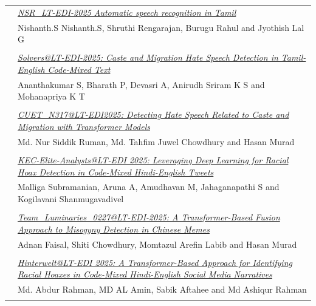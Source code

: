 \documentclass[11pt,oneside]{book}
\begin{document}
\begin{tabular}{p{24mm}p{124mm}}
                      & \hyperlink{page.95}{\emph{NSR\_LT-EDI-2025 Automatic speech recognition in Tamil}}\\
        & Nishanth.S Nishanth.S\index{Nishanth.S}, Shruthi Rengarajan\index{Rengarajan}, Burugu Rahul\index{Rahul} and Jyothish Lal G\index{G}\\\\
                
                      & \hyperlink{page.100}{\emph{Solvers@LT-EDI-2025: Caste and Migration Hate Speech Detection in Tamil-English Code-Mixed Text}}\\
        & Ananthakumar S\index{S}, Bharath P\index{P}, Devasri A\index{A}, Anirudh Sriram K S\index{S} and Mohanapriya K T\index{T}\\\\
                
                      & \hyperlink{page.105}{\emph{CUET\_N317@LT-EDI2025: Detecting Hate Speech Related to Caste and Migration with Transformer Models}}\\
        & Md. Nur Siddik Ruman\index{Ruman}, Md. Tahfim Juwel Chowdhury\index{Chowdhury} and Hasan Murad\index{Murad}\\\\
                
                      & \hyperlink{page.111}{\emph{KEC-Elite-Analysts@LT-EDI 2025: Leveraging Deep Learning for Racial Hoax Detection in Code-Mixed Hindi-English Tweets}}\\
        & Malliga Subramanian\index{Subramanian}, Aruna A\index{A}, Amudhavan M\index{M}, Jahaganapathi S\index{S} and Kogilavani Shanmugavadivel\index{Shanmugavadivel}\\\\
                
                      & \hyperlink{page.116}{\emph{Team\_Luminaries\_0227@LT-EDI-2025: A Transformer-Based Fusion Approach to Misogyny Detection in Chinese Memes}}\\
        & Adnan Faisal\index{Faisal}, Shiti Chowdhury\index{Chowdhury}, Momtazul Arefin Labib\index{Labib} and Hasan Murad\index{Murad}\\\\
                
                      & \hyperlink{page.121}{\emph{Hinterwelt@LT-EDI 2025: A Transformer-Based Approach for Identifying Racial Hoaxes in Code-Mixed Hindi-English Social Media Narratives}}\\
        & Md. Abdur Rahman\index{Rahman}, MD AL Amin\index{Amin}, Sabik Aftahee\index{Aftahee} and Md Ashiqur Rahman\index{Rahman}\\\\
              \end{tabular}
\end{document}
